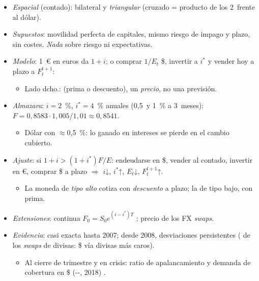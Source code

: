 \documentclass{article}
\begin{document}
\begin{columnas}
\begin{itemize}
\item \emph{Espacial} (contado): bilateral y \emph{triangular} (cruzado = producto de los 2~frente al dólar).
\end{itemize}
\begin{itemize}
\item \emph{Supuestos}: movilidad perfecta de capitales, mismo riesgo de impago y plazo, sin costes. \emph{Nada} sobre riesgo ni expectativas.
\item \emph{Modelo}: 1~€ en euros da $1+i$; o comprar $1/E_t$ \$, invertir a $i^{*}$ y vender hoy a plazo a $F_t^{t+1}$:
  \begin{itemize}
  \item Lado dcho.:  (prima o descuento), un \emph{precio}, no una previsión.
  \end{itemize}
\end{itemize}
\begin{itemize}
\item \emph{Almazara}: $i=2$~\%, $i^{*}=4$~\% anuales (0,5~y 1~\% a 3~meses): $F=0{,}8583\cdot1{,}005/1{,}01\approx0{,}8541$.
  \begin{itemize}
  \item Dólar con  $\approx$0,5~\%: lo ganado en intereses se pierde en el cambio cubierto.
  \end{itemize}
\item \emph{Ajuste}: si $1+i>(1+i^{*})F/E$: endeudarse en \$, vender al contado, invertir en €, comprar \$ a plazo $\Rightarrow$ $i$↓, $i^{*}$↑, $E_t$↓, $F_t^{t+1}$↑.
  \begin{itemize}
  \item La moneda de \emph{tipo alto} cotiza con \emph{descuento} a plazo; la de tipo bajo, con prima.
  \end{itemize}
\item \emph{Extensiones}: continua $F_0=S_0e^{(i-i^{*})T}$ ; precio de los FX \emph{swaps}.
\item \emph{Evidencia}: casi exacta hasta 2007; desde 2008, desviaciones persistentes ( de los \emph{swaps} de divisas: \$ vía divisas más caros).
  \begin{itemize}
  \item Al cierre de trimestre y en crisis: ratio de apalancamiento y demanda de cobertura en \$ (--, 2018) .

\end{itemize}
\end{itemize}
\end{columnas}
\end{document}
